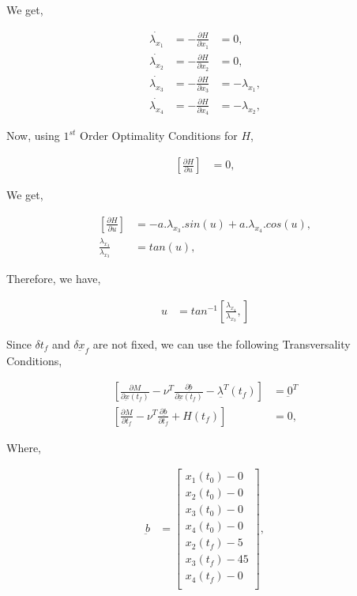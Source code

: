\documentclass[11pt,usenames]{article}
\begin{document}
	We get,
	
	\begin{align}
	\dot{\lambda_{x_{1}}} &= - \frac{\partial H}{\partial x_{1}}  &= 0, \nonumber \\
	\dot{\lambda_{x_{2}}} &= - \frac{\partial H}{\partial x_{2}}  &= 0,\\
	\dot{\lambda_{x_{3}}} &= - \frac{\partial H}{\partial x_{3}}  &= - \lambda_{x_{1}},\nonumber\\
	\dot{\lambda_{x_{4}}} &= - \frac{\partial H}{\partial x_{4}}  &= - \lambda_{x_{2}}, \nonumber
	\end{align}
	
	
	\newpage
	
	
	Now, using $ 1^{st} $ Order Optimality Conditions for $ H $, 
	
	\begin{align}
	\left[ \frac{\partial H}{\partial u}  \right] &= 0  ,
	\end{align}
	
	We get,
	
	\begin{align}
	\left[ \frac{\partial H}{\partial u}  \right] &= -a.\lambda_{x_{3}}.sin(u) + a.\lambda_{x_{4}}.cos(u)  , \nonumber \\
	\frac{\lambda_{x_{4}}}{\lambda_{x_{3}}}  &= tan(u) , \nonumber
	\end{align}
	
	Therefore, we have,
	
	\begin{align}
	u &= tan^{-1} \left[ \frac{\lambda_{x_{4}}}{\lambda_{x_{3}}} , \right]
	\end{align}
	
	Since $\delta t_{f}$ and $\delta \underbar{x}_{f}$ are not fixed, we can use the following Transversality Conditions,
	
	\begin{align}
	\left[ \frac{\partial M}{\partial{\underbar{x}(t_{f})} } - \nu^{T} \frac{\partial \underbar b}{\partial{\underbar{x}(t_{f})} } - \underbar{\lambda^{T}}(t_{f}) \right]&= \underbar 0^{T} \\
	\left[ \frac{\partial M}{\partial{t_{f}} } - \nu^{T} \frac{\partial \underbar b}{\partial{t_{f}} } + H(t_{f}) \right]&=  0 ,
	\end{align}
	
	Where,
	
	\begin{align}
	\underbar b &= 
	\begin{bmatrix}
	x_{1}(t_{0})-0 \\ x_{2}(t_{0})-0 \\ x_{3}(t_{0})-0 \\ x_{4}(t_{0})-0 \\ x_{2}(t_{f})-5 \\ x_{3}(t_{f})-45 \\ x_{4}(t_{f})-0 \\
	\end{bmatrix} , \nonumber
	\end{align}
	
\end{document}
